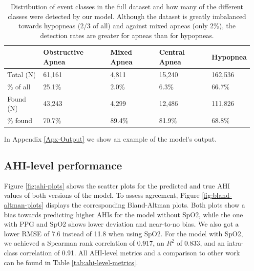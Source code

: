 \renewcommand{\arraystretch}{1.5}
\begin{table}
    \centering
    \begin{tabular}{ l p{2cm} p{2cm} p{2cm} p{2cm} }
        & Obstructive \newline Apnea & Mixed \newline Apnea & Central \newline Apnea & Hypopnea \\
        \hline
        Total (N) & 61,161 & 4,811 & 15,240 & 162,536 \\
        \% of all & 25.1\% & 2.0\% & 6.3\%  &  66.7\% \\
        \hline
        Found (N) & 43,243 & 4,299 & 12,486 & 111,826 \\
        \% found & 70.7\% & 89.4\% & 81.9\% & 68.8\% \\
    \end{tabular}
    \caption{Distribution of event classes in the full dataset and how many of the different classes were detected by our model. Although the dataset is greatly imbalanced towards hypopneas (2/3 of all) and against mixed apneas (only 2\%), the detection rates are greater for apneas than for hypopneas. \label{tab:event-class-distribution}}
\end{table}

In Appendix \ref{Apx-Output} we show an example of the model's output.

\subsection*{AHI-level performance}

Figure \ref{fig:ahi-plots} shows the scatter plots for the predicted and true AHI values of both versions of the model. To assess agreement, Figure \ref{fig:bland-altman-plots} displays the corresponding Bland-Altman plots. Both plots show a bias towards predicting higher AHIs for the model without SpO2, while the one with PPG and SpO2 shows lower deviation and near-to-no bias. We also got a lower RMSE of 7.6 instead of 11.8 when using SpO2.
For the model with SpO2, we achieved a Spearman rank correlation of 0.917, an $R^2$ of 0.833, and an intra-class correlation of 0.91.
All AHI-level metrics and a comparison to other work can be found in Table \ref{tab:ahi-level-metrics}.

